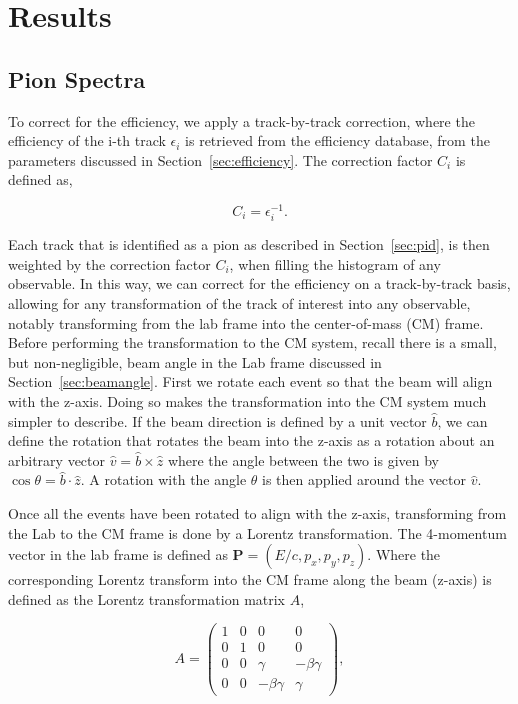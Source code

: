\chapter{Results}
 
\section{Pion Spectra}
\label{sec:pionSpectra}

To correct for the efficiency, we apply a track-by-track correction, where the efficiency of the i-th track $\epsilon_i$ is retrieved from the efficiency database, from the parameters discussed in Section~\ref{sec:efficiency}. The correction factor $C_i$ is defined as,

\begin{equation}
C_i = \epsilon_i^{-1}.
\end{equation}

Each track that is identified as a pion as described in Section~\ref{sec:pid}, is then weighted by the correction factor $C_i$, when filling the histogram of any observable. In this way, we can correct for the efficiency on a track-by-track basis, allowing for any transformation of the track of interest into any observable, notably transforming from the lab frame into the center-of-mass (CM) frame. Before performing the transformation to the CM system, recall there is a small, but non-negligible, beam angle in the Lab frame discussed in Section~\ref{sec:beamangle}. First we rotate each event so that the beam will align with the z-axis. Doing so makes the transformation into the CM system much simpler to describe. If the beam direction is defined by a unit vector $\hat{b}$, we can define the rotation that rotates the beam into the z-axis as a rotation about an arbitrary vector $\hat{v} = \hat{b}\times\hat{z}$ where the angle between the two is given by $\cos \theta = \hat{b}\cdot\hat{z}$. A rotation with the angle $\theta$ is then applied around the vector $\hat{v}$.

Once all the events have been rotated to align with the z-axis, transforming from the Lab to the CM frame is done by a Lorentz transformation. The 4-momentum vector in the lab frame is defined as $\textbf{P} = (E/c,p_x,p_y,p_z)$. Where the corresponding Lorentz transform into the CM frame along the beam (z-axis) is defined as the Lorentz transformation matrix $A$,

\begin{equation}
A = \begin{pmatrix}
1 & 0 & 0 & 0\\
0 & 1 & 0 & 0\\
0 & 0 & \gamma & -\beta \gamma\\
0 & 0 & -\beta \gamma & \gamma
\end{pmatrix},
\end{equation}

